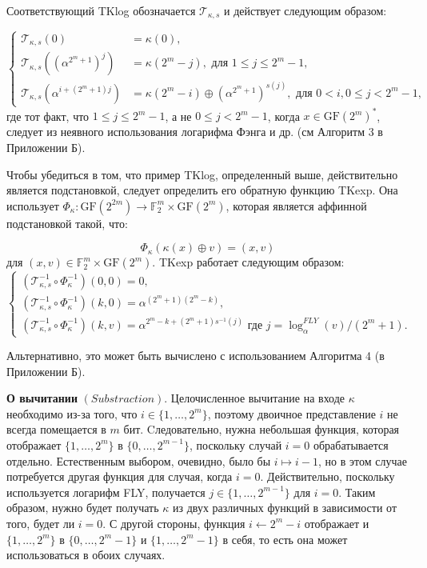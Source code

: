 Соответствующий TKlog обозначается \(\mathscr{T}_{\kappa,s}\) и действует следующим образом:

$$
\begin{cases}
  \mathscr{T}_{\kappa, s}(0) & =\kappa(0), \\
  \mathscr{T}_{\kappa, s}\left(\left(\alpha^{2^m+1}\right)^j\right) & =\kappa\left(2^m-j\right), \text { для } 1 \leq j \leq 2^m-1, \\
  \mathscr{T}_{\kappa, s}\left(\alpha^{i+\left(2^m+1\right) j}\right) & =\kappa\left(2^m-i\right) \oplus\left(\alpha^{2^m+1}\right)^{s(j)}, \text { для } 0<i, 0 \leq j<2^m-1,
\end{cases}
$$ где тот факт, что \(1 \leq j \leq 2^m - 1\), а не \(0 \leq j < 2^m - 1\), когда \(x \in \mathrm{GF}(2^m)^*\), следует из неявного использования логарифма Фэнга и др. (см Алгоритм 3 в Приложении Б).

Чтобы убедиться в том, что пример TKlog, определенный выше, действительно является подстановкой, следует определить его обратную функцию TKexp. Она использует \(\Phi_\kappa: \text{GF}(2^{2m}) \rightarrow \mathbb{F}^m_2 \times \text{GF}(2^m)\), которая является аффинной подстановкой такой, что:

\[
\Phi_\kappa(\kappa(x) \oplus v) = (x, v)
\] для \((x, v) \in \mathbb{F}^m_2 \times \text{GF}(2^m)\). TKexp работает следующим образом:
$$
\left\{\begin{array}{l}
  \left(\mathscr{T}_{\kappa, s}^{-1} \circ \Phi_\kappa^{-1}\right)(0,0)=0, \\
  \left(\mathscr{T}_{\kappa, s}^{-1} \circ \Phi_\kappa^{-1}\right)(k, 0)=\alpha^{\left(2^m+1\right)\left(2^m-k\right)}, \\
  \left(\mathscr{T}_{\kappa, s}^{-1} \circ \Phi_\kappa^{-1}\right)(k, v)=\alpha^{2^m-k+\left(2^m+1\right) s^{-1}(j)} \text { где } j=\log _\alpha^{F L Y}(v) /\left(2^m+1\right) .
  \end{array}\right.
$$

Альтернативно, это может быть вычислено с использованием Алгоритма 4 (в Приложении Б).

\textbf{О вычитании} \((Substraction).\) Целочисленное вычитание на входе \(\kappa\) необходимо из-за того, что \(i \in \{1, \ldots, 2^m\}\), поэтому двоичное представление \(i\) не всегда помещается в \(m\) бит. Cледовательно, нужна небольшая функция, которая отображает \(\{1, \ldots, 2^m\}\) в \(\{0, \ldots, 2^{m - 1}\}\), поскольку случай \(i = 0\) обрабатывается отдельно. Естественным выбором, очевидно, было бы \(i \mapsto i - 1\), но в этом случае потребуется другая функция для случая, когда \(i = 0\). Действительно, поскольку используется логарифм FLY, получается \(j \in \{1, \ldots, 2^{m - 1}\}\) для \(i = 0\). Таким образом, нужно будет получать \(\kappa\) из двух различных функций в зависимости от того, будет ли \(i = 0\). С другой стороны, функция \(i \leftarrow 2^m - i\) отображает и \(\{1, \ldots, 2^m\}\) в \(\{0, \ldots, 2^m - 1\}\) и \(\{1, \ldots, 2^m - 1\}\) в себя, то есть она может использоваться в обоих случаях.

